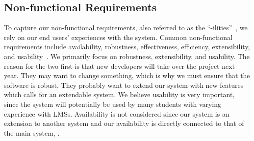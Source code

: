 \subsection{Non-functional Requirements}
To capture our non-functional requirements, also referred to as the ``-ilities''~\cite[p.288]{Larman04}, we rely on our end users' experiences with the system.
Common non-functional requirements include availability, robustness, effectiveness, efficiency, extensibility, and usability~\cite[sec.~9.1]{roedeaalborg}.
We primarily focus on robustness, extensibility, and usability.
The reason for the two first is that new developers will take over the project next year. 
They may want to change something, which is why we must ensure that the software is robust. 
They probably want to extend our system with new features which calls for an extendable system.
We believe usability is very important, since the system will potentially be used by many students with varying experience with LMSs.
Availability is not considered since our system is an extension to another system and our availability is directly connected to that of the main system, \moodle{}.



\FloatBarrier
